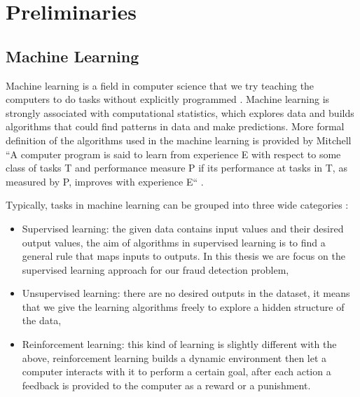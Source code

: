 
\chapter{Preliminaries}

\ifpdf
    \graphicspath{{Chapter2/Figs/Raster/}{Chapter2/Figs/PDF/}{Chapter2/Figs/}}
\else
    \graphicspath{{Chapter2/Figs/Vector/}{Chapter2/Figs/}}
\fi


\section{Machine Learning}
\label{preliminaries:machine_learning}

Machine learning is a field in computer science that we try teaching the computers to do tasks without explicitly programmed \citep{samuel2000some, koza1996automated}. Machine learning is strongly associated with computational statistics, which explores data and builds algorithms that could find patterns in data and make predictions. More formal definition of the algorithms used in the machine learning is provided by Mitchell ``A computer program is said to learn from experience E with respect to some class of tasks T and performance measure P if its performance at tasks in T, as measured by P, improves with experience E`` \citep{mitchell1997machine}.

Typically, tasks in machine learning can be grouped into three wide categories \citep{russell1995modern}:

\begin{itemize}
\item Supervised learning: the given data contains input values and their desired output values, the aim of algorithms in supervised learning is to find a general rule that maps inputs to outputs. In this thesis we are focus on the supervised learning approach for our fraud detection problem,
\item Unsupervised learning: there are no desired outputs in the dataset, it means that we give the learning algorithms freely to explore a hidden structure of the data,
\item Reinforcement learning: this kind of learning is slightly different with the above, reinforcement learning builds a dynamic environment then let a computer interacts with it to perform a certain goal, after each action a feedback is provided to the computer as a reward or a punishment.
\end{itemize}


